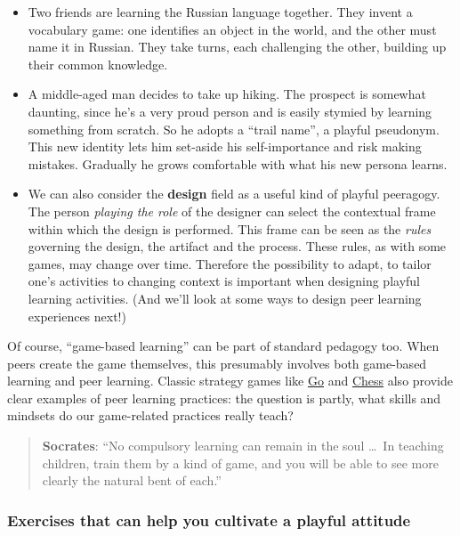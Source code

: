 \begin{itemize}
\itemsep1pt\parskip0pt
\item
  Two friends are learning the Russian language together. They invent a
  vocabulary game: one identifies an object in the world, and the other
  must name it in Russian. They take turns, each challenging the other,
  building up their common knowledge.
\item
  A middle-aged man decides to take up hiking. The prospect is somewhat
  daunting, since he's a very proud person and is easily stymied by
  learning something from scratch. So he adopts a ``trail name'', a
  playful pseudonym. This new identity lets him set-aside his
  self-importance and risk making mistakes. Gradually he grows
  comfortable with what his new persona learns.
\item
  We can also consider the \textbf{design} field as a useful kind of
  playful peeragogy. The person \emph{playing the role} of the designer
  can select the contextual frame within which the design is performed.
  This frame can be seen as the \emph{rules} governing the design, the
  artifact and the process. These rules, as with some games, may change
  over time. Therefore the possibility to adapt, to tailor one's
  activities to changing context is important when designing playful
  learning activities. (And we'll look at some ways to design peer
  learning experiences next!)
\end{itemize}

Of course, ``game-based learning'' can be part of standard pedagogy too.
When peers create the game themselves, this presumably involves both
game-based learning and peer learning. Classic strategy games like
\href{http://senseis.xmp.net/?MythOfOrigin}{Go} and
\href{http://www.amazon.com/Chess-Success-Using-Strengths-Children/dp/0767915682}{Chess}
also provide clear examples of peer learning practices: the question is
partly, what skills and mindsets do our game-related practices really
teach?

\begin{quote}
\textbf{Socrates}: ``No compulsory learning can remain in the soul \ldots\
In teaching children, train them by a kind of game, and you will be able
to see more clearly the natural bent of each.''
\end{quote}

\subsubsection{Exercises that can help you cultivate a playful attitude}

